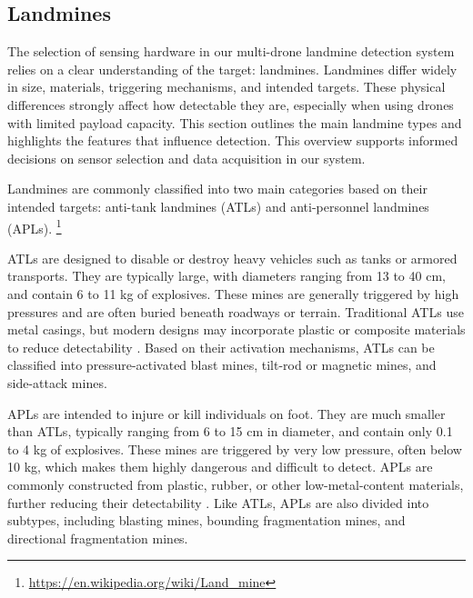 \subsection{Landmines}

The selection of sensing hardware in our multi-drone landmine detection system relies on a clear understanding of the target: landmines. Landmines differ widely in size, materials, triggering mechanisms, and intended targets. These physical differences strongly affect how detectable they are, especially when using drones with limited payload capacity. This section outlines the main landmine types and highlights the features that influence detection. This overview supports informed decisions on sensor selection and data acquisition in our system.

Landmines are commonly classified into two main categories based on their intended targets: anti-tank landmines (ATLs) and anti-personnel landmines (APLs).
\footnote{\url{https://en.wikipedia.org/wiki/Land_mine}}

ATLs are designed to disable or destroy heavy vehicles such as tanks or armored transports. They are typically large, with diameters ranging from 13 to 40 cm, and contain 6 to 11 kg of explosives\cite{paik2002image}. These mines are generally triggered by high pressures and are often buried beneath roadways or terrain. Traditional ATLs use metal casings, but modern designs may incorporate plastic or composite materials to reduce detectability \cite{evans2024detection}. Based on their activation mechanisms, ATLs can be classified into pressure-activated blast mines, tilt-rod or magnetic mines, and side-attack mines.

APLs are intended to injure or kill individuals on foot. They are much smaller than ATLs, typically ranging from 6 to 15 cm in diameter, and contain only 0.1 to 4 kg of explosives\cite{paik2002image}. These mines are triggered by very low pressure, often below 10 kg, which makes them highly dangerous and difficult to detect. APLs are commonly constructed from plastic, rubber, or other low-metal-content materials, further reducing their detectability \cite{kaya2017buried}. Like ATLs, APLs are also divided into subtypes, including blasting mines, bounding fragmentation mines, and directional fragmentation mines.

